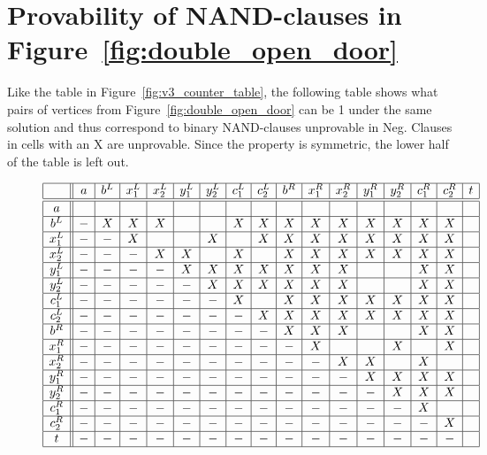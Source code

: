 \section{Provability of NAND-clauses in Figure~\ref{fig:double_open_door}}
\label{sec:Provability of NAND-clauses in double door}
Like the table in Figure~\ref{fig:v3_counter_table}, the following table shows what pairs of vertices from Figure~\ref{fig:double_open_door} can be 1 under the same solution and thus correspond to binary NAND-clauses unprovable in Neg.
Clauses in cells with an X are unprovable.
Since the property is symmetric, the lower half of the table is left out.
\begin{figure}[!h]
  \centering
  \[\begin{array}{|c||c|c|c|c|c|c|c|c|c|c|c|c|c|c|c|c|c|c|}
    \hline
          & a & b^L & x^L_1 & x^L_2 & y^L_1 & y^L_2 & c^L_1 & c^L_2 & b^R & x^R_1 & x^R_2 & y^R_1 & y^R_2 & c^R_1 & c^R_2 & t\\ \hline\hline
    a     & & & & & & & & & & & & & & & & \\ \hline
    b^L   &-& X & X & X & & & X & X & X & X & X & X & X & X & X & \\ \hline
    x^L_1 &-&-& X & & & X & & X & X & X & X & X & X & X & X & \\ \hline
    x^L_2 &-&-&-& X & X & & X & & X & X & X & X & X & X & X & \\ \hline
    y^L_1 &-&-&-&-& X & X & X & X & X & X & X & & & X & X & \\ \hline
    y^L_2 &-&-&-&-&-& X & X & X & X & X & X & & & X & X & \\ \hline
    c^L_1 &-&-&-&-&-&-& X & & X & X & X & X & X & X & X & \\ \hline
    c^L_2 &-&-&-&-&-&-&-& X & X & X & X & X & X & X & X & \\ \hline
    b^R   &-&-&-&-&-&-&-&-& X & X & X & & & X & X & \\ \hline
    x^R_1 &-&-&-&-&-&-&-&-&-& X & & & X & & X & \\ \hline
    x^R_2 &-&-&-&-&-&-&-&-&-&-& X & X & & X & & \\ \hline
    y^R_1 &-&-&-&-&-&-&-&-&-&-&-& X & X & X & X & \\ \hline
    y^R_2 &-&-&-&-&-&-&-&-&-&-&-&-& X & X & X & \\ \hline
    c^R_1 &-&-&-&-&-&-&-&-&-&-&-&-&-& X & & \\ \hline
    c^R_2 &-&-&-&-&-&-&-&-&-&-&-&-&-&-& X & \\ \hline
    t     &-&-&-&-&-&-&-&-&-&-&-&-&-&-&-& \\ \hline
  \end{array}\]
  \caption{}
  \label{fig:double_door_counter_table}
\end{figure}

